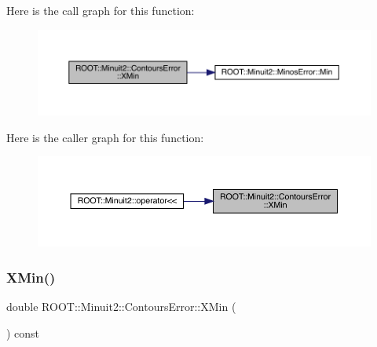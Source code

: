 Here is the call graph for this function\+:
\nopagebreak
\begin{figure}[H]
\begin{center}
\leavevmode
\includegraphics[width=350pt]{d3/de9/classROOT_1_1Minuit2_1_1ContoursError_ac0dbac1ec08765a632908c88c5f24822_cgraph}
\end{center}
\end{figure}
Here is the caller graph for this function\+:\nopagebreak
\begin{figure}[H]
\begin{center}
\leavevmode
\includegraphics[width=350pt]{d3/de9/classROOT_1_1Minuit2_1_1ContoursError_ac0dbac1ec08765a632908c88c5f24822_icgraph}
\end{center}
\end{figure}
\mbox{\label{classROOT_1_1Minuit2_1_1ContoursError_ac0dbac1ec08765a632908c88c5f24822}} 
\subsubsection{\texorpdfstring{XMin()}{XMin()}\hspace{0.1cm}{\footnotesize\ttfamily [2/2]}}
{\footnotesize\ttfamily double R\+O\+O\+T\+::\+Minuit2\+::\+Contours\+Error\+::\+X\+Min (\begin{DoxyParamCaption}{ }\end{DoxyParamCaption}) const\hspace{0.3cm}{\ttfamily [inline]}}

